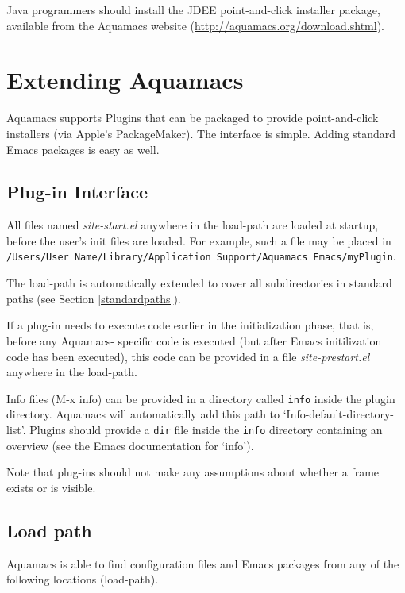 \documentclass[11pt,letterpaper]{article}
\newcommand{\ttfile}{\tt}
\begin{document}
Java programmers should install the JDEE point-and-click installer package, available from the Aquamacs website (\url{http://aquamacs.org/download.shtml}).

\section{Extending Aquamacs}

Aquamacs supports Plugins that can be packaged to provide point-and-click installers (via Apple's 
PackageMaker). The interface is simple.
Adding standard Emacs packages is easy as well.

\subsection{Plug-in Interface}

All files named \emph{site-start.el} anywhere in the load-path are loaded at startup, before the user's init files are loaded. For example, such a file may be placed in \\  {\ttfile /Users/User Name/Library/Application Support/Aquamacs Emacs/myPlugin}. 

 The load-path is automatically extended to cover all subdirectories in standard paths (see Section \ref {standardpaths}).

If a plug-in needs to execute code earlier in the initialization phase, that is, before any Aquamacs- specific code is executed (but after Emacs initilization code has been executed), this code can be provided in a file \emph{site-prestart.el} anywhere in the load-path.

Info files (M-x info) can be provided in a directory called {\ttfile info} inside the plugin directory. Aquamacs will automatically add this path to `Info-default-directory-list'. Plugins should provide a {\ttfile dir} file inside the {\ttfile info} directory containing an overview (see the Emacs documentation for `info').

Note that plug-ins should not make any assumptions about whether a frame exists or is visible.


\subsection{Load path}

Aquamacs is able to find configuration files and Emacs packages
from any of the following locations (load-path). 
\label{standardpaths}
\end{document}
